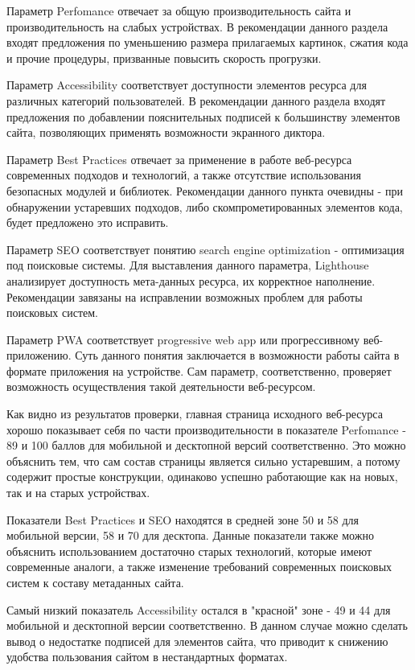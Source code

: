 Параметр Perfomance отвечает за общую производительность сайта и производительность на слабых устройствах.
В рекомендации данного раздела входят предложения по уменьшению размера прилагаемых картинок, сжатия кода и прочие процедуры, призванные повысить скорость прогрузки.

Параметр Accessibility соответствует доступности элементов ресурса для различных категорий пользователей.
В рекомендации данного раздела входят предложения по добавлении пояснительных подписей к большинству элементов сайта, позволяющих применять возможности экранного диктора.

Параметр Best Practices отвечает за применение в работе веб-ресурса современных подходов и технологий, а также отсутствие использования безопасных модулей и библиотек.
Рекомендации данного пункта очевидны - при обнаружении устаревших подходов, либо скомпрометированных элементов кода, будет предложено это исправить.

Параметр SEO соответствует понятию search engine optimization - оптимизация под поисковые системы.
Для выставления данного параметра, Lighthouse анализирует доступность мета-данных ресурса, их корректное наполнение.
Рекомендации завязаны на исправлении возможных проблем для работы поисковых систем.

Параметр PWA соответствует progressive web app или прогрессивному веб-приложению.
Суть данного понятия заключается в возможности работы сайта в формате приложения на устройстве.
Сам параметр, соответственно, проверяет возможность осуществления такой деятельности веб-ресурсом.

Как видно из результатов проверки, главная страница исходного веб-ресурса хорошо показывает себя по части производительности в показателе Perfomance - 89 и 100 баллов для мобильной и десктопной версий соответственно.
Это можно объяснить тем, что сам состав страницы является сильно устаревшим, а потому содержит простые конструкции, одинаково успешно работающие как на новых, так и на старых устройствах.

Показатели Best Practices и SEO находятся в средней зоне 50 и 58 для мобильной версии, 58 и 70 для десктопа.
Данные показатели также можно объяснить использованием достаточно старых технологий, которые имеют современные аналоги, а также изменение требований современных поисковых систем к составу метаданных сайта.

Самый низкий показатель Accessibility остался в "красной" зоне - 49 и 44 для мобильной и десктопной версии соответственно.
В данном случае можно сделать вывод о недостатке подписей для элементов сайта, что приводит к снижению удобства пользования сайтом в нестандартных форматах.

